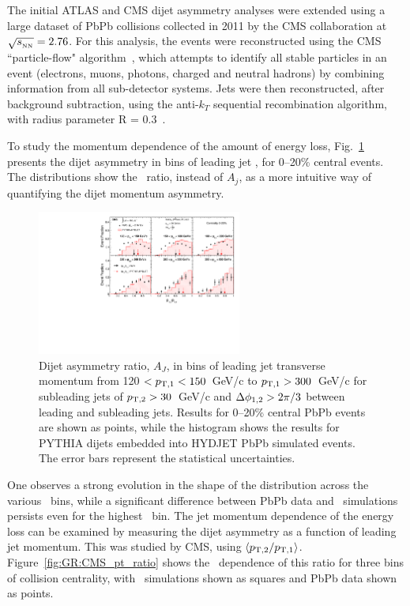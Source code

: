 The initial ATLAS and CMS dijet asymmetry analyses were extended using a large dataset of PbPb collisions
collected in 2011 by the CMS collaboration at $\sqrt{s_{_{\rm NN}}}=2.76$\TeV. For this analysis, the events were
reconstructed using the  CMS ``particle-flow" algorithm~\cite{CMS-PAS-PFT-10-002,MattPFlow},
which attempts to identify all stable particles in an
event (electrons, muons, photons, charged and neutral hadrons)
by combining information from all sub-detector systems.
Jets were then reconstructed, after background subtraction, using the anti-$k_T$ sequential recombination algorithm,
with radius parameter R = 0.3~\cite{Cacciari:2008gp}.

To study the momentum dependence of the amount of energy loss,
Fig.~\ref{fig:GR:CMS_dijet_pt} presents the dijet asymmetry in bins of leading jet
\pT, for 0--20\% central events.
The distributions show the \ptrat\ ratio, instead of $A_j$,  as a more intuitive
way of quantifying the dijet momentum asymmetry.

\begin{figure}[!th]
\begin{center}
\includegraphics[width=0.6\textwidth]{jetfigures/dijet_imbalance5_0to20_pt_20120103_subt.pdf}
\caption{Dijet asymmetry ratio, $A_{J}$, in bins of leading jet transverse momentum from
120 $ < p_{\rm{T},1} < 150$~GeV/c to $p_{\rm{T},1} > 300$~GeV/c for
  subleading jets of $p_{\rm{T},2}> 30$~GeV/c
and $\Delta\phi_{1,2}>2\pi/3$ between leading and subleading jets.
Results for 0--20\% central PbPb events are shown as points, while the histogram
shows the results for
PYTHIA dijets embedded into HYDJET PbPb simulated events. The error bars represent the statistical uncertainties.}
\label{fig:GR:CMS_dijet_pt}
\end{center}
\end{figure}
One observes a strong evolution in the shape of the distribution across the
various \pT\ bins, while a significant difference between PbPb data and
\PYTHYD\ simulations persists even for the highest \pT\ bin.
The jet momentum dependence of the energy loss can be examined by measuring the
dijet asymmetry as a function of leading jet momentum. This was studied by CMS,
using $\langle p_{\rm{T},2}/p_{\rm{T},1} \rangle$. Figure~\ref{fig:GR:CMS_pt_ratio}
shows the \pT\ dependence of this ratio for three
bins of collision centrality, with \PYTHYD\ simulations shown
as squares and PbPb data shown as points.


